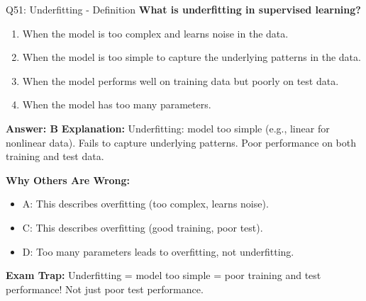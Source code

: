 \documentclass[8pt]{beamer}
\begin{document}
	\begin{frame}{Q51: Underfitting - Definition}
		\fontsize{6.5}{7.5}\selectfont
		\textbf{What is underfitting in supervised learning?}
		
		\begin{enumerate}
			\item When the model is too complex and learns noise in the data.
			\item When the model is too simple to capture the underlying patterns in the data.
			\item When the model performs well on training data but poorly on test data.
			\item When the model has too many parameters.
		\end{enumerate}
		
		\vspace{0.05cm}
		\textcolor{myblue}{\textbf{Answer: B}}
		\vspace{0.05cm}
		\textcolor{myblue}{\textbf{Explanation:}} Underfitting: model too simple (e.g., linear for nonlinear data). Fails to capture underlying patterns. Poor performance on both training and test data.
		
		\vspace{0.05cm}
		\textcolor{myred}{\textbf{Why Others Are Wrong:}}
		\begin{itemize}
			\item \textcolor{myred}{A:} This describes overfitting (too complex, learns noise).
			\item \textcolor{myred}{C:} This describes overfitting (good training, poor test).
			\item \textcolor{myred}{D:} Too many parameters leads to overfitting, not underfitting.
		\end{itemize}
		
		\textcolor{myred}{\textbf{Exam Trap:}} Underfitting = \textcolor{myblue}{model too simple} = poor training and test performance! Not just poor test performance.
	\end{frame}
	
\end{document}
